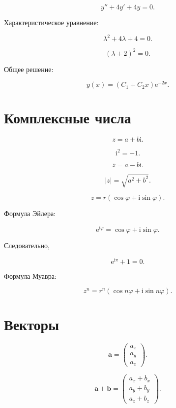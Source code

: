 \documentclass[12pt,a4paper]{article}
\theoremstyle{definition}
\theoremstyle{remark}
\newcommand{\vect}[1]{\bm{#1}}
\newcommand{\abs}[1]{\left|#1\right|}
\newcommand{\e}{\mathrm{e}}
\newcommand{\ii}{\mathrm{i}}
\begin{document}
\[
    y''+4y'+4y=0.
\]

Характеристическое уравнение:

\[
    \lambda^2+4\lambda+4=0.
\]

\[
    (\lambda+2)^2=0.
\]

Общее решение:

\[
    y(x)=(C_1+C_2x)\e^{-2x}.
\]


\section{Комплексные числа}

\[
    z=a+b\ii.
\]

\[
    \ii^2=-1.
\]

\[
    \overline{z}=a-b\ii.
\]

\[
    \abs{z}=\sqrt{a^2+b^2}.
\]

\[
    z=r(\cos\varphi+\ii\sin\varphi).
\]

Формула Эйлера:

\[
    \e^{\ii\varphi}
    =
    \cos\varphi+\ii\sin\varphi.
\]

Следовательно,

\[
    \e^{\ii\pi}+1=0.
\]

Формула Муавра:

\[
    z^n
    =
    r^n
    \left(
        \cos n\varphi
        +
        \ii\sin n\varphi
    \right).
\]


\section{Векторы}

\[
    \vect{a}
    =
    \begin{pmatrix}
        a_x\\
        a_y\\
        a_z
    \end{pmatrix}.
\]

\[
    \vect{a}+\vect{b}
    =
    \begin{pmatrix}
        a_x+b_x\\
        a_y+b_y\\
        a_z+b_z
    \end{pmatrix}.
\]
\end{document}

